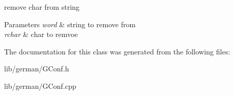 remove char from string 


\begin{DoxyParams}{\-Parameters}
{\em word} & string to remove from \\
\hline
{\em rchar} & char to remvoe \\
\hline
\end{DoxyParams}


\-The documentation for this class was generated from the following files\-:\begin{DoxyCompactItemize}
\item 
lib/german/\-G\-Conf.\-h\item 
lib/german/\-G\-Conf.\-cpp\end{DoxyCompactItemize}
